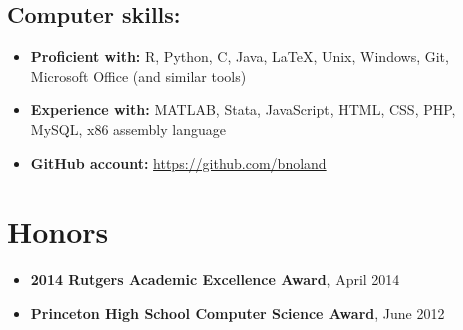\documentclass[letterpaper,12pt]{article}
\begin{document}
\subsection*{Computer skills:}

\begin{itemize}
\item \textbf{Proficient with:} R, Python, C, Java, \LaTeX, Unix,
  Windows, Git, Microsoft Office (and similar tools)
\item \textbf{Experience with:} MATLAB, Stata, JavaScript, HTML, CSS,
  PHP, MySQL, x86 assembly language
\item \textbf{GitHub account:} \url{https://github.com/bnoland}
\end{itemize}

\section*{Honors}
\begin{itemize}
\item \textbf{2014 Rutgers Academic Excellence Award}, April 2014
\item \textbf{Princeton High School Computer Science Award}, June 2012
\end{itemize}
\fi
\end{document}
